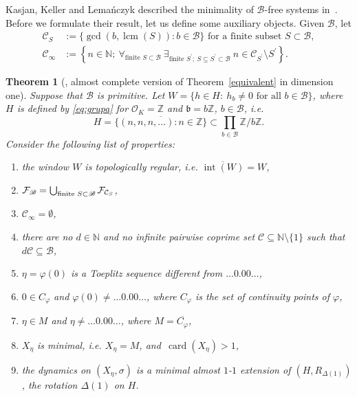 \documentclass[leqno,a4paper,12pt]{article}
\DeclareMathOperator{\lcm}{lcm}
\newtheorem{Th}{Theorem}[section]
\theoremstyle{definition}
\newcommand{\cf}{{\cal F}}
\newcommand{\Z}{{\mathbb{Z}}}
\newcommand{\N}{{\mathbb{N}}}
\newcommand{\OK}{\mathcal{O}_K}
\newcommand{\sB}{\mathscr{B}}
\begin{document}
Kasjan, Keller and Lema\'nczyk described the minimality of $\sB$-free systems in~\cite{MR3947636}. Before we formulate their result, let us define some auxiliary objects. Given $\sB$, let
\begin{align}
\mathcal{C}_{S}&:=\{\gcd(b,\lcm(S)):  b\in\sB\} \text{ for a finite subset }S\subset \sB,\label{wym1}\\
\mathcal{C}_{\infty}&:=\left\{n \in \mathbb{N}; \ \forall_{\text{finite }S\subset \sB}\ \exists_{\text{finite }S^{\prime};\ S \subseteq S^{\prime} \subset \mathscr{B}}\ n \in \mathcal{C}_{S^{\prime}} \setminus S^{\prime}\right\}.\nonumber
\end{align}
\begin{Th}[{\cite[Theorem B]{MR3947636}}, almost complete version of Theorem~\ref{equivalent} in dimension one]\label{toeplitz}
Suppose that $\sB$ is primitive. Let $W=\{h\in H: \ h_b\neq0\text{ for all }b\in\sB\}$, where $H$ is defined by \eqref{eq:grupa} for $\OK=\Z$ and $\mathfrak{b}=b\Z$, $b\in\sB$, i.e.
\[
H=\overline{\{(n,n,n,\dots) : n\in \Z\}}\subset \prod_{b\in\mathscr{B}}\Z/b\Z.
\]
Consider the following list of properties:
\begin{enumerate}[(1)]
\item the window $W$ is topologically regular, i.e. $\overline{\operatorname{int}(W)}=W$,\label{B1}
\item $\mathcal{F}_{\sB}=\bigcup_{\text{finite }S\subset \sB} \cf_{\mathcal{C}_{S}}$, \label{B2}
\item $\mathcal{C}_{\infty}=\emptyset$,  \label{B3}
\item there are no $d\in\N$ and no infinite pairwise coprime set $\mathcal{C} \subseteq \N\setminus\{1\}$ such that $d \mathcal{C} \subseteq \mathscr{B}$,\label{B4}
\item $\eta=\varphi(0)$ is a Toeplitz sequence different from $\ldots0.00\ldots$,\label{B5}
\item $0 \in C_{\varphi}$ and $\varphi(0) \neq\ldots0.00\ldots$, where $C_\varphi$ is the set of continuity points of $\varphi$,\label{B6}
\item $\eta \in M$ and $\eta \neq\ldots0.00\ldots$, where $M=\overline{C_\varphi}$,\label{B7}
\item $X_{\eta}$ is minimal, i.e. $X_{\eta}=M$, and~$\operatorname{card}\left(X_{\eta}\right)>1$,\label{B8}
\item the dynamics on $(X_{\eta},\sigma)$ is a minimal almost $1$-$1$ extension of $\left(H, R_{\Delta(1)}\right)$, the rotation $\Delta(1)$ on $H$.\label{B9}
\end{enumerate}

\end{Th}
\end{document}
